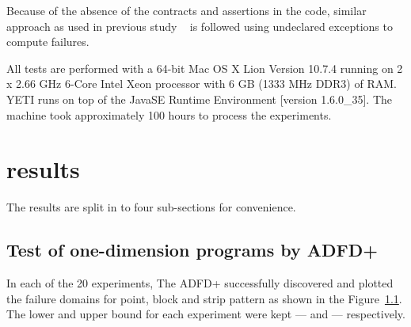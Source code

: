\documentclass{acm_proc_article-sp}
\begin{document}
Because of the absence of the contracts and assertions in the code, similar approach as used in previous study ~\cite{ahmad2013adfd, Oriol2012} is followed using undeclared exceptions to compute failures.

All tests are performed with a 64-bit Mac OS X Lion Version 10.7.4 running on 2 x 2.66 GHz 6-Core Intel Xeon processor with 6 GB (1333 MHz DDR3) of RAM. YETI runs on top of the Java\texttrademark  SE Runtime Environment [version 1.6.0\_35]. The machine took approximately 100 hours to process the experiments.

\section{results}

The results are split in to four sub-sections for convenience. 

\subsection{Test of one-dimension programs by ADFD+}
In each of the 20 experiments, The ADFD+ successfully discovered and plotted the failure domains for point, block and strip pattern as shown in the Figure~\ref{}. The lower and upper bound for each experiment were kept --- and --- respectively.
\end{document}
